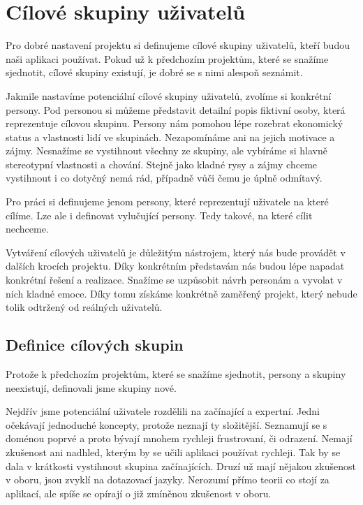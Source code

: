 \chapter{Cílové skupiny uživatelů}

Pro dobré nastavení projektu si definujeme cílové skupiny uživatelů, kteří budou naši aplikaci používat. Pokud už k předchozím projektům, které se snažíme sjednotit, cílové skupiny existují, je dobré se s nimi alespoň seznámit.

Jakmile nastavíme potenciální cílové skupiny uživatelů, zvolíme si konkrétní persony. Pod personou si můžeme představit detailní popis fiktivní osoby, která reprezentuje cílovou skupinu. Persony nám pomohou lépe rozebrat ekonomický status a vlastnosti lidí ve skupinách. Nezapomínáme ani na jejich motivace a zájmy. Nesnažíme se vystihnout všechny ze skupiny, ale vybíráme si hlavně stereotypní vlastnosti a chování. Stejně jako kladné rysy a zájmy chceme vystihnout i co dotyčný nemá rád, případně vůči čemu je úplně odmítavý. 

Pro práci si definujeme jenom persony, které reprezentují uživatele na které cílíme. Lze ale i definovat vylučující persony. Tedy takové, na které cílit nechceme.

Vytváření cílových uživatelů je důležitým nástrojem, který nás bude provádět v dalších krocích projektu. Díky konkrétním představám nás budou lépe napadat konkrétní řešení a realizace. Snažíme se uzpůsobit návrh personám a vyvolat v nich kladné emoce. Díky tomu získáme konkrétně zaměřený projekt, který nebude tolik odtržený od reálných uživatelů.

\section{Definice cílových skupin}

Protože k předchozím projektům, které se snažíme sjednotit, persony a skupiny neexistují, definovali jsme skupiny nové.

Nejdřív jsme potenciální uživatele rozdělili na začínající a expertní. Jedni očekávají jednoduché koncepty, protože neznají ty složitější. Seznamují se s doménou poprvé a proto bývají mnohem rychleji frustrovaní, či odrazení. Nemají zkušenost ani nadhled, kterým by se učili aplikaci používat rychleji. Tak by se dala v krátkosti vystihnout skupina začínajících. Druzí už mají nějakou zkušenost v oboru, jsou zvyklí na dotazovací jazyky. Nerozumí přímo teorii co stojí za aplikací, ale spíše se opírají o již zmíněnou zkušenost v oboru.

